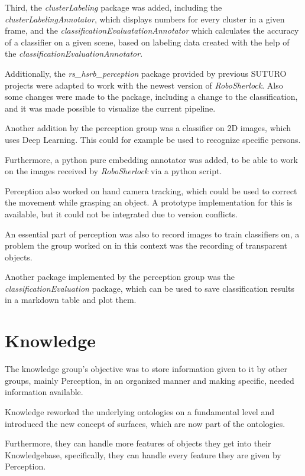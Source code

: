 \documentclass[main.tex]{subfiles}
\begin{document}
		Third, the \textit{clusterLabeling} package was added, including the \textit{clusterLabelingAnnotator}, which displays numbers for every cluster in a given frame, and the \textit{classificationEvaluatationAnnotator} which calculates the accuracy of a classifier on a given scene, based on labeling data created with the help of the \textit{classificationEvaluationAnnotator}. 
		
		Additionally, the \textit{rs\_hsrb\_perception} package provided by previous SUTURO projects were adapted to work with the newest version of \textit{RoboSherlock}. Also some changes were made to the package, including a change to the classification, and it was made possible to visualize the current pipeline.
		
		Another addition by the perception group was a classifier on 2D images, which uses Deep Learning. This could for example be used to recognize specific persons.
		
		Furthermore, a python pure embedding annotator was added, to be able to work on the images received by \textit{RoboSherlock} via a python script.
		
		Perception also worked on hand camera tracking, which could be used to correct the movement while grasping an object. A prototype implementation for this is available, but it could not be integrated due to version conflicts. 
		
		An essential part of perception was also to record images to train classifiers on, a problem the group worked on in this context was the recording of transparent objects.
		
		Another package implemented by the perception group was the \textit{classificationEvaluation} package, which can be used to save classification results in a markdown table and plot them.
		
		
		
		
		\section{Knowledge}
		The knowledge group's objective was to store information given to it by other groups, mainly Perception, in an organized manner and making specific, needed information available.
		
		Knowledge reworked the underlying ontologies on a fundamental level and introduced the new concept of surfaces, which are now part of the ontologies.
		
		Furthermore, they can handle more features of objects they get into their Knowledgebase, specifically, they can handle every feature they are given by Perception.
		
\end{document}
